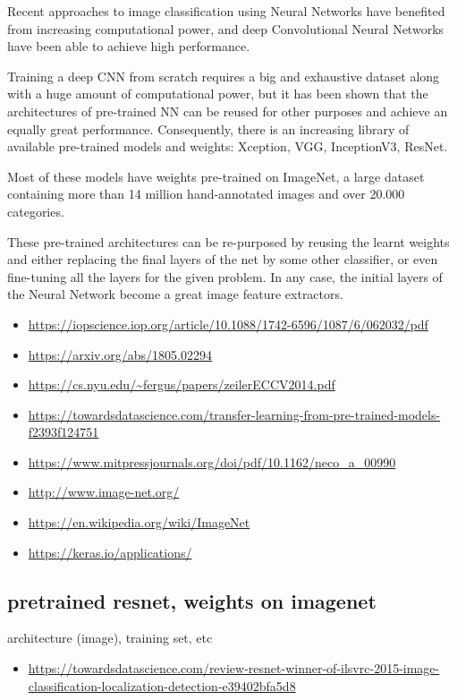 Recent approaches to image classification using Neural Networks have benefited from increasing computational power, and deep Convolutional Neural Networks have been able to achieve high performance. 

Training a deep CNN from scratch requires a big and exhaustive dataset along with a huge amount of computational power, but it has been shown that the architectures of pre-trained NN can be reused for other purposes and achieve an equally great performance. Consequently, there is an increasing library of available pre-trained models and weights: Xception, VGG, InceptionV3, ResNet.

Most of these models have weights pre-trained on ImageNet, a large dataset containing more than 14 million hand-annotated images and over 20.000 categories.

These pre-trained architectures can be re-purposed by reusing the learnt weights and either replacing the final layers of the net by some other classifier, or even fine-tuning all the layers for the given problem. In any case, the initial layers of the Neural Network become a great image feature extractors.

\begin{itemize}
	\item \url{https://iopscience.iop.org/article/10.1088/1742-6596/1087/6/062032/pdf}
	\item \url{https://arxiv.org/abs/1805.02294}
	\item \url{https://cs.nyu.edu/~fergus/papers/zeilerECCV2014.pdf}
	\item \url{https://towardsdatascience.com/transfer-learning-from-pre-trained-models-f2393f124751}
	\item \url{https://www.mitpressjournals.org/doi/pdf/10.1162/neco_a_00990}
	\item \url{http://www.image-net.org/}
	\item \url{https://en.wikipedia.org/wiki/ImageNet}
	\item \url{https://keras.io/applications/}
\end{itemize}

\subsection{pretrained resnet, weights on imagenet}

architecture (image), training set, etc

\begin{itemize}
	\item \url{https://towardsdatascience.com/review-resnet-winner-of-ilsvrc-2015-image-classification-localization-detection-e39402bfa5d8}
\end{itemize}

